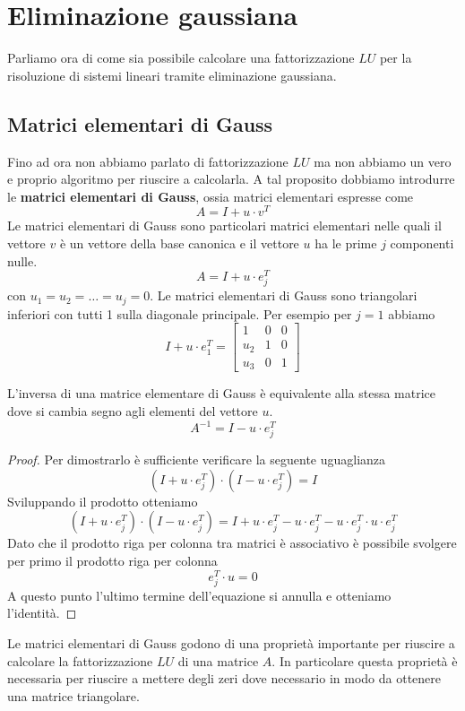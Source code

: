 \section{Eliminazione gaussiana}
Parliamo ora di come sia possibile calcolare una fattorizzazione $LU$ per la risoluzione di sistemi lineari
tramite eliminazione gaussiana.

\subsection{Matrici elementari di Gauss}
Fino ad ora non abbiamo parlato di fattorizzazione $LU$ ma non abbiamo un vero e proprio algoritmo per riuscire a
calcolarla. A tal proposito dobbiamo introdurre le \textbf{matrici elementari di Gauss}, ossia matrici elementari
espresse come
\[ A = I + u \cdot v^T \]
Le matrici elementari di Gauss sono particolari matrici elementari nelle quali il vettore $v$ è un vettore della
base canonica e il vettore $u$ ha le prime $j$ componenti nulle.
\[ A = I + u \cdot e_j^T \]
con $u_1 = u_2 = \dots = u_j = 0$. Le matrici elementari di Gauss sono triangolari inferiori con tutti 1 sulla
diagonale principale. Per esempio per $j=1$ abbiamo
\[
	I + u \cdot e_1^T =
	\begin{bmatrix}
		1   & 0 & 0 \\
		u_2 & 1 & 0 \\
		u_3 & 0 & 1
	\end{bmatrix}
\]
\begin{theorem}
	L'inversa di una matrice elementare di Gauss è equivalente alla stessa matrice dove si cambia segno agli
	elementi del vettore $u$.
	\[ A^{-1} = I - u \cdot e_j^T \]
	\begin{proof}
		Per dimostrarlo è sufficiente verificare la seguente uguaglianza
		\[ (I + u \cdot e_j^T) \cdot (I - u \cdot e_j^T) = I \]
		Sviluppando il prodotto otteniamo
		\[
			(I + u \cdot e_j^T) \cdot (I - u \cdot e_j^T) =
			I + u \cdot e_j^T - u \cdot e_j^T - u \cdot e_j^T \cdot u \cdot e_j^T
		\]
		Dato che il prodotto riga per colonna tra matrici è associativo è possibile svolgere per primo il prodotto
		riga per colonna
		\[ e_j^T \cdot u = 0 \]
		A questo punto l'ultimo termine dell'equazione si annulla e otteniamo l'identità.
	\end{proof}
\end{theorem}

Le matrici elementari di Gauss godono di una proprietà importante per riuscire a calcolare la fattorizzazione
$LU$ di una matrice $A$. In particolare questa proprietà è necessaria per riuscire a mettere degli zeri dove
necessario in modo da ottenere una matrice triangolare.

